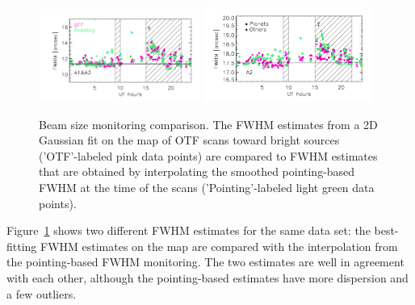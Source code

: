 \begin{figure}[ht!]
  \begin{center}
    \includegraphics[clip=true, trim={0.9cm, 0.5cm, 0.5cm, 0.5cm}, width=0.4725\textwidth]{Figures/Beam_monitoring_with_otfs_vs_ut_compare_pointings_1mm.pdf}
    \includegraphics[clip=true, trim={0.5cm, 0.5cm, 0.5cm, 0.5cm}, width=0.4875\textwidth]{Figures/Beam_monitoring_with_otfs_vs_ut_compare_pointings_a2.pdf}
    \caption[Beam size monitoring comparison]{Beam size monitoring
      comparison. The FWHM estimates from a 2D Gaussian fit on the map
      of OTF scans toward bright sources ('OTF'-labeled pink data
      points) are compared to FWHM estimates that are obtained by
      interpolating the smoothed pointing-based FWHM at the time of
      the scans ('Pointing'-labeled light green data points).}
\label{fig:beam_monitoring_compare}
\end{center}
\end{figure}
%
Figure~\ref{fig:beam_monitoring_compare} shows two different FWHM
estimates for the same data set: the best-fitting FWHM estimates on
the map are compared with the interpolation from the pointing-based
FWHM monitoring. The two estimates are well in agreement with each
other, although the pointing-based estimates have more dispersion and
a few outliers.



